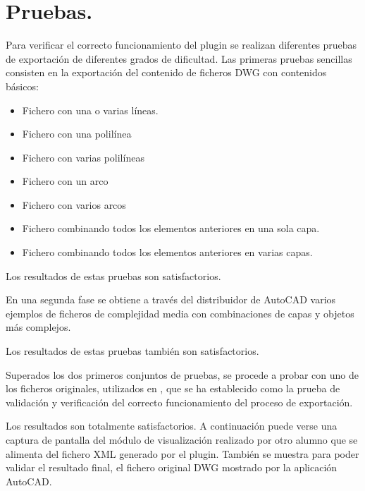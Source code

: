\section{Pruebas.}

Para verificar el correcto funcionamiento del plugin se realizan diferentes pruebas de exportación de diferentes grados de dificultad. Las primeras pruebas sencillas consisten en la exportación del contenido de ficheros DWG con contenidos básicos:

\begin{itemize}

\item{Fichero con una o varias líneas.}
\item{Fichero con una polilínea}
\item{Fichero con varias polilíneas}
\item{Fichero con un arco}
\item{Fichero con varios arcos}
\item{Fichero combinando todos los elementos anteriores en una sola capa.}
\item{Fichero combinando todos los elementos anteriores en varias capas.}

\end{itemize}

Los resultados de estas pruebas son satisfactorios.

En una segunda fase se obtiene a través del distribuidor de AutoCAD varios ejemplos de ficheros de complejidad media con combinaciones de capas y objetos más complejos.

Los resultados de estas pruebas también son satisfactorios. 

Superados los dos primeros conjuntos de pruebas, se procede a probar con uno de los ficheros originales, utilizados en \cite{Miguel-Munoz}, que se ha establecido como la prueba de validación y verificación del correcto funcionamiento del proceso de exportación. 

Los resultados son totalmente satisfactorios. A continuación puede verse una captura de pantalla del módulo de visualización realizado por otro alumno que se alimenta del fichero XML generado por el plugin. También se muestra para poder validar el resultado final, el fichero original DWG mostrado por la aplicación AutoCAD.

